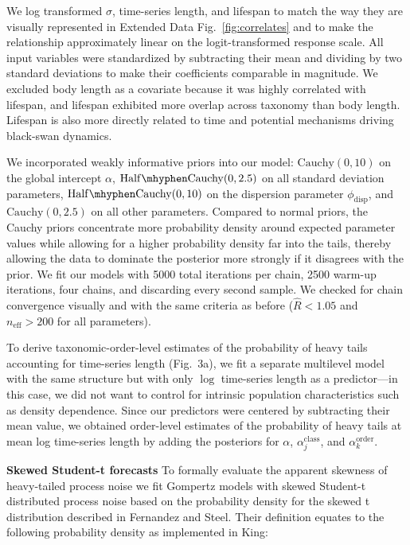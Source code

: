 We log transformed \(\sigma\), time-series length, and lifespan to match the way they are visually represented in Extended Data Fig.~\ref{fig:correlates} and to make the relationship approximately linear on the logit-transformed response scale. All input variables were standardized by subtracting their mean and dividing by two standard deviations to make their coefficients comparable in magnitude\cite{gelman2008c}. We excluded body length as a covariate because it was highly correlated with lifespan, and lifespan exhibited more overlap across taxonomy than body length. Lifespan is also more directly related to time and potential mechanisms driving black-swan dynamics.

We incorporated weakly informative priors into our model: \(\mathrm{Cauchy}(0, 10)\) on the global intercept \(\alpha\), \(\mathrm{Half\mhyphen Cauchy}(0, 2.5)\) on all standard deviation parameters, \(\mathrm{Half\mhyphen Cauchy}(0, 10)\) on the dispersion parameter \(\phi_\mathrm{disp}\), and \(\mathrm{Cauchy}(0, 2.5)\) on all other parameters\cite{gelman2006c, gelman2008d}. Compared to normal priors, the Cauchy priors concentrate more probability density around expected parameter values while allowing for a higher probability density far into the tails, thereby allowing the data to dominate the posterior more strongly if it disagrees with the prior. We fit our models with 5000 total iterations per chain, 2500 warm-up iterations, four chains, and discarding every second sample. We checked for chain convergence visually and with the same criteria as before (\(\widehat{R} < 1.05\) and \(n_\mathrm{eff} >200\) for all parameters).

To derive taxonomic-order-level estimates of the probability of heavy tails accounting for time-series length (Fig.~3a), we fit a separate multilevel model with the same structure but with only \(\log\) time-series length as a predictor---in this case, we did not want to control for intrinsic population characteristics such as density dependence. Since our predictors were centered by subtracting their mean value, we obtained order-level estimates of the probability of heavy tails at mean log time-series length by adding the posteriors for \(\alpha\), \(\alpha^\mathrm{class}_j\), and \(\alpha^\mathrm{order}_k\).

\textbf{Skewed Student-t forecasts} To formally evaluate the apparent skewness of heavy-tailed process noise we fit Gompertz models with skewed Student-t distributed process noise based on the probability density for the skewed t distribution described in Fernandez and Steel\cite{fernandez1998}. Their definition equates to the following probability density as implemented in King\cite{king2012}:

